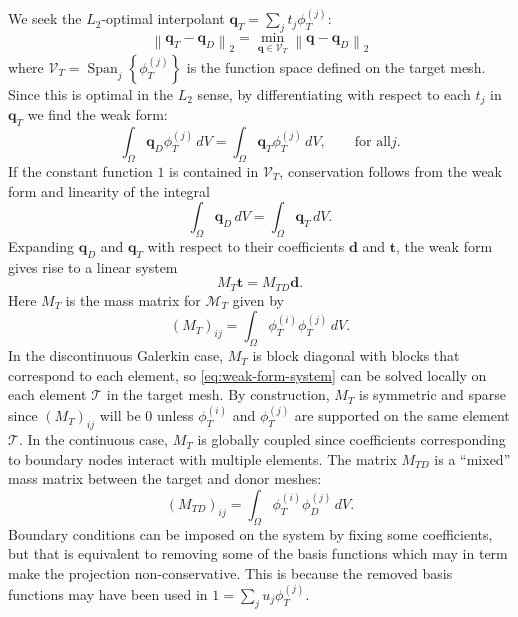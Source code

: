 We seek the \(L_2\)-optimal interpolant \(\bm{q}_T = \sum_j t_j \phi_T^{(j)}\):
\begin{equation}
\left \lVert \bm{q}_T - \bm{q}_D \right \rVert_2 =
\min_{\bm{q} \in \mathcal{V}_T}
\left \lVert \bm{q} - \bm{q}_D \right \rVert_2
\end{equation}
where \(\mathcal{V}_T = \operatorname{Span}_j\left\{\phi_T^{(j)}\right\}\)
is the function space defined on the target mesh. Since this is optimal in
the \(L_2\) sense, by differentiating with respect to each \(t_j\) in
\(\bm{q}_T\) we find the weak form:
\begin{equation}
\int_{\Omega} \bm{q}_D \phi_T^{(j)} \, dV =
  \int_{\Omega} \bm{q}_T \phi_T^{(j)} \, dV, \qquad \text{for all} j.
\end{equation}
If the constant function \(1\) is contained in \(\mathcal{V}_T\),
conservation follows from the weak form and linearity of the integral
\begin{equation}
\int_{\Omega} \bm{q}_D \, dV =
  \int_{\Omega} \bm{q}_T \, dV.
\end{equation}
Expanding \(\bm{q}_D\) and \(\bm{q}_T\) with respect to their coefficients
\(\bm{d}\) and \(\bm{t}\), the weak form gives rise to a linear system
\begin{equation}\label{eq:weak-form-system}
M_T \bm{t} = M_{TD} \bm{d}.
\end{equation}
Here \(M_T\) is the mass matrix for
\(\mathcal{M}_T\) given by
\begin{equation}
\left(M_T\right)_{ij} = \int_{\Omega} \phi_T^{(i)} \phi_T^{(j)} \, dV.
\end{equation}
In the discontinuous Galerkin case, \(M_T\) is block diagonal with blocks
that correspond to each element, so \eqref{eq:weak-form-system} can be
solved locally on each element \(\mathcal{T}\) in the target mesh. By
construction, \(M_T\) is symmetric and sparse since \(\left(M_T\right)_{ij}\)
will be \(0\) unless \(\phi_T^{(i)}\) and \(\phi_T^{(j)}\) are supported
on the same element \(\mathcal{T}\). In the continuous case, \(M_T\) is
globally coupled since coefficients corresponding to boundary nodes interact
with multiple elements. The matrix \(M_{TD}\) is a ``mixed'' mass matrix
between the target and donor meshes:
\begin{equation}
\left(M_{TD}\right)_{ij} = \int_{\Omega} \phi_T^{(i)} \phi_D^{(j)} \, dV.
\end{equation}
Boundary conditions can be imposed on the system by fixing some coefficients,
but that is equivalent to removing some of the basis functions which may
in term make the projection non-conservative. This is because the removed
basis functions may have been used in \(1 = \sum_j u_j \phi_{T}^{(j)}\).

